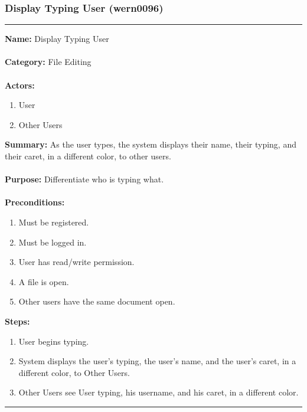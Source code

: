 \documentclass[11pt]{report}
\begin{document}
\subsubsection{Display Typing User (wern0096)}
\vspace{2pt}
\hrule
\vspace{8pt}
	\noindent\textbf{Name:} Display Typing User \\ \\
	\textbf{Category:} File Editing \\ \\
	\textbf{Actors:} 
	\begin{enumerate}
		\item User
		\item Other Users
	\end{enumerate}
	\textbf{Summary:} As the user types, the system displays their name, their typing, and their caret, in a different color, to other users. \\ \\
	\textbf{Purpose:} Differentiate who is typing what. \\ \\
	\textbf{Preconditions:} 
	\begin{enumerate}
		\item Must be registered.
		\item Must be logged in.
		\item User has read/write permission.
		\item A file is open.
		\item Other users have the same document open.
	\end{enumerate}
	\textbf{Steps:}
	\begin{enumerate}
		\item User begins typing.
		\item System displays the user's typing, the user's name, and the user's caret, in a different color, to Other Users.
		\item Other Users see User typing, his username, and his caret, in a different color.
	\end{enumerate}
\vspace{8pt}
\hrule
\newpage
\end{document}
